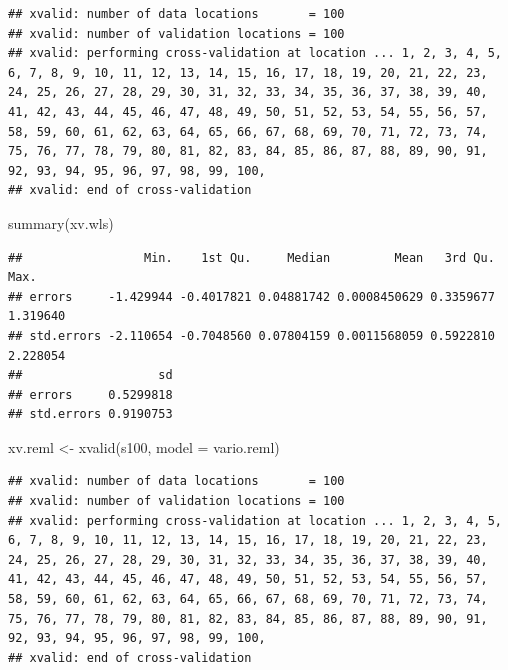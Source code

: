 \documentclass[
  spanish,
]{book}
\newenvironment{Shaded}{\begin{snugshade}}{\end{snugshade}}
\newcommand{\AttributeTok}[1]{\textcolor[rgb]{0.77,0.63,0.00}{#1}}
\newcommand{\FunctionTok}[1]{\textcolor[rgb]{0.00,0.00,0.00}{#1}}
\newcommand{\NormalTok}[1]{#1}
\newcommand{\OtherTok}[1]{\textcolor[rgb]{0.56,0.35,0.01}{#1}}
\theoremstyle{break}
\begin{document}
\begin{verbatim}
## xvalid: number of data locations       = 100
## xvalid: number of validation locations = 100
## xvalid: performing cross-validation at location ... 1, 2, 3, 4, 5, 6, 7, 8, 9, 10, 11, 12, 13, 14, 15, 16, 17, 18, 19, 20, 21, 22, 23, 24, 25, 26, 27, 28, 29, 30, 31, 32, 33, 34, 35, 36, 37, 38, 39, 40, 41, 42, 43, 44, 45, 46, 47, 48, 49, 50, 51, 52, 53, 54, 55, 56, 57, 58, 59, 60, 61, 62, 63, 64, 65, 66, 67, 68, 69, 70, 71, 72, 73, 74, 75, 76, 77, 78, 79, 80, 81, 82, 83, 84, 85, 86, 87, 88, 89, 90, 91, 92, 93, 94, 95, 96, 97, 98, 99, 100, 
## xvalid: end of cross-validation
\end{verbatim}

\begin{Shaded}
\begin{Highlighting}[]
\FunctionTok{summary}\NormalTok{(xv.wls)}
\end{Highlighting}
\end{Shaded}

\begin{verbatim}
##                 Min.    1st Qu.     Median         Mean   3rd Qu.     Max.
## errors     -1.429944 -0.4017821 0.04881742 0.0008450629 0.3359677 1.319640
## std.errors -2.110654 -0.7048560 0.07804159 0.0011568059 0.5922810 2.228054
##                   sd
## errors     0.5299818
## std.errors 0.9190753
\end{verbatim}

\begin{Shaded}
\begin{Highlighting}[]
\NormalTok{xv.reml }\OtherTok{\textless{}{-}} \FunctionTok{xvalid}\NormalTok{(s100, }\AttributeTok{model =}\NormalTok{ vario.reml)}
\end{Highlighting}
\end{Shaded}

\begin{verbatim}
## xvalid: number of data locations       = 100
## xvalid: number of validation locations = 100
## xvalid: performing cross-validation at location ... 1, 2, 3, 4, 5, 6, 7, 8, 9, 10, 11, 12, 13, 14, 15, 16, 17, 18, 19, 20, 21, 22, 23, 24, 25, 26, 27, 28, 29, 30, 31, 32, 33, 34, 35, 36, 37, 38, 39, 40, 41, 42, 43, 44, 45, 46, 47, 48, 49, 50, 51, 52, 53, 54, 55, 56, 57, 58, 59, 60, 61, 62, 63, 64, 65, 66, 67, 68, 69, 70, 71, 72, 73, 74, 75, 76, 77, 78, 79, 80, 81, 82, 83, 84, 85, 86, 87, 88, 89, 90, 91, 92, 93, 94, 95, 96, 97, 98, 99, 100, 
## xvalid: end of cross-validation
\end{verbatim}
\end{document}
